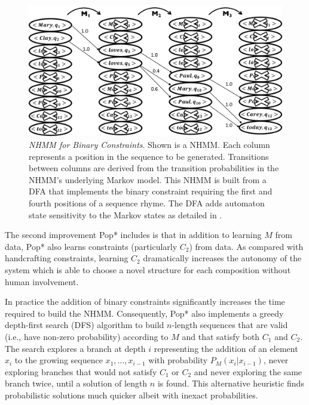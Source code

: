 \documentclass[phd,electronic,oneside,twosidetoc,letterpaper,chaptercenter,parttop,lol,lof,lot]{byumsphd}
\begin{document}
\begin{figure}
    \centering
    \includegraphics[width=\linewidth]{state_sensitive_nhmm}
    \caption{\textit{NHMM for Binary Constraints}. Shown is a NHMM. Each column represents a position in the sequence to be generated. Transitions between columns are derived from the transition probabilities in the NHMM's underlying Markov model. This NHMM is built from a DFA that implements the binary constraint requiring the first and fourth positions of a sequence rhyme. The DFA adds automaton state sensitivity to the Markov states as detailed in \cite{bodily2018relational}.}
    \label{fig:graphical_model}
\end{figure}

The second improvement Pop* includes is that in addition to learning ${M}$ from data, Pop* also learns constraints (particularly ${C_2}$) from data. As compared with handcrafting constraints, learning $C_2$ dramatically increases the autonomy of the system which is able to choose a novel structure for each composition without human involvement.

In practice the addition of binary constraints significantly increases the time required to build the NHMM. Consequently, Pop* also implements a greedy depth-first search (DFS) algorithm to build $n$-length sequences that are valid (i.e., have non-zero probability) according to $M$ and that satisfy both $C_1$ and $C_2$. The search explores a branch at depth $i$ representing the addition of an element $x_i$ to the growing sequence $x_1,\dots,x_{i-1}$ with probability $P_M(x_i|x_{i-1})$, never exploring branches that would not satisfy $C_1$ or $C_2$ and never exploring the same branch twice, until a solution of length $n$ is found. This alternative heuristic finds probabilistic solutions much quicker albeit with inexact probabilities.
\end{document}

